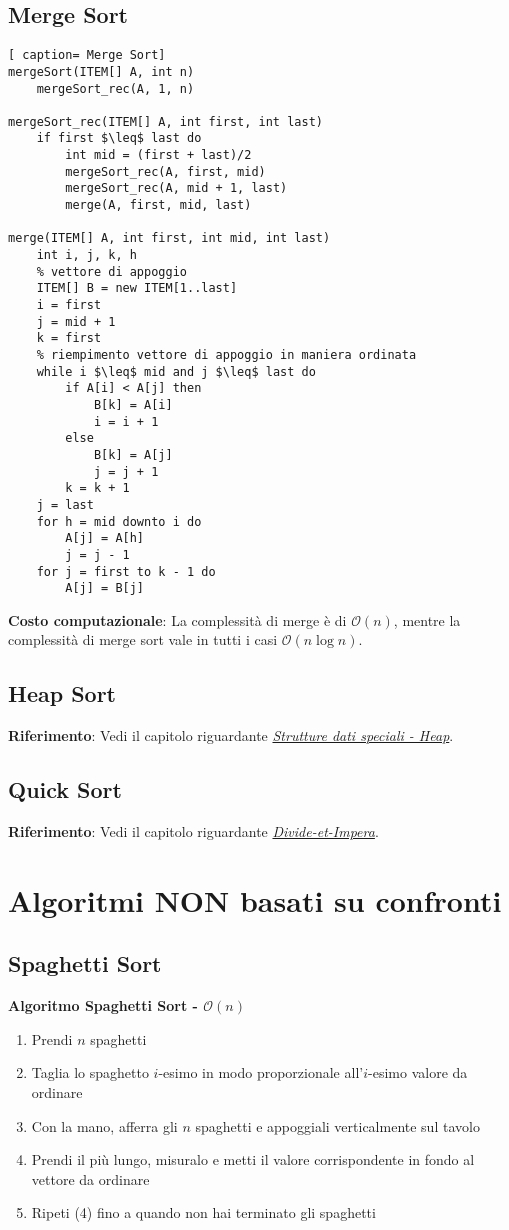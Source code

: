 \documentclass[../cheatSheetAlgoritmi.tex]{subfiles}
\begin{document}
\subsection{Merge Sort}
\begin{lstlisting}[ caption= Merge Sort]
mergeSort(ITEM[] A, int n)
	mergeSort_rec(A, 1, n)

mergeSort_rec(ITEM[] A, int first, int last)
  	if first $\leq$ last do
		int mid = (first + last)/2
		mergeSort_rec(A, first, mid)
		mergeSort_rec(A, mid + 1, last)
		merge(A, first, mid, last)

merge(ITEM[] A, int first, int mid, int last)
  	int i, j, k, h
  	% vettore di appoggio
  	ITEM[] B = new ITEM[1..last]
  	i = first
  	j = mid + 1
  	k = first
  	% riempimento vettore di appoggio in maniera ordinata
  	while i $\leq$ mid and j $\leq$ last do
		if A[i] < A[j] then
			B[k] = A[i]
			i = i + 1
		else  
			B[k] = A[j]
			j = j + 1
		k = k + 1
	j = last
  	for h = mid downto i do
  		A[j] = A[h]
  		j = j - 1
  	for j = first to k - 1 do
  		A[j] = B[j]
\end{lstlisting}
\textbf{Costo computazionale}: La complessità di merge è di $\mathcal{O}(n)$, mentre la complessità di merge sort vale in tutti i casi $\mathcal{O}(n\log{}n)$.\
\subsection{Heap Sort}
\textbf{Riferimento}: Vedi il capitolo riguardante \hyperref[sec:heap]{\emph{Strutture dati speciali - Heap}}.
\subsection{Quick Sort}
\textbf{Riferimento}: Vedi il capitolo riguardante \hyperref[sec:quicksort]{\emph{Divide-et-Impera}}.

\section{Algoritmi NON basati su confronti}
\subsection{Spaghetti Sort}
\textbf{Algoritmo Spaghetti Sort - $\mathcal{O}(n)$}
\begin{enumerate}
	\item Prendi $n$ spaghetti
	\item Taglia lo spaghetto $i$-esimo in modo proporzionale all'$i$-esimo valore da ordinare
	\item Con la mano, afferra gli $n$ spaghetti e appoggiali verticalmente sul tavolo
	\item Prendi il più lungo, misuralo e metti il valore corrispondente in fondo al vettore da ordinare
	\item Ripeti (4) fino a quando non hai terminato gli spaghetti
\end{enumerate}
\end{document}
